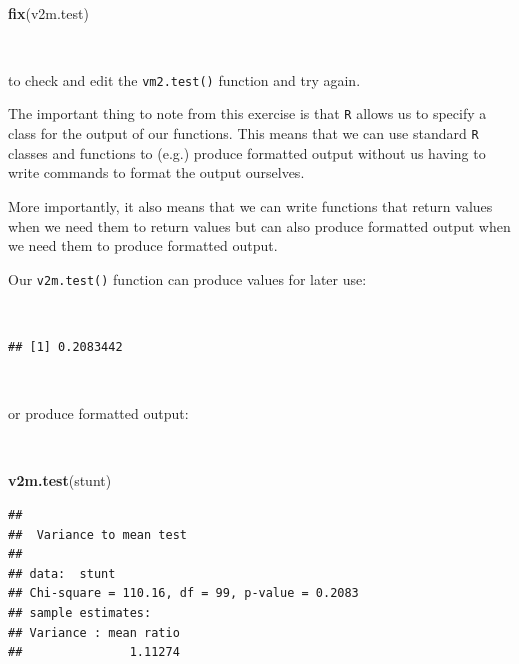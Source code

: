 \documentclass[12pt,a4paper]{book}
\newenvironment{Shaded}{\begin{snugshade}}{\end{snugshade}}
\newcommand{\KeywordTok}[1]{\textcolor[rgb]{0.13,0.29,0.53}{\textbf{#1}}}
\newcommand{\StringTok}[1]{\textcolor[rgb]{0.31,0.60,0.02}{#1}}
\newcommand{\OperatorTok}[1]{\textcolor[rgb]{0.81,0.36,0.00}{\textbf{#1}}}
\newcommand{\NormalTok}[1]{#1}
\theoremstyle{definition}
\theoremstyle{definition}
\theoremstyle{definition}
\theoremstyle{remark}
\begin{document}
~

\begin{Shaded}
\begin{Highlighting}[]
\KeywordTok{fix}\NormalTok{(v2m.test)}
\end{Highlighting}
\end{Shaded}

~

to check and edit the \texttt{vm2.test()} function and try again.

The important thing to note from this exercise is that \texttt{R} allows
us to specify a class for the output of our functions. This means that
we can use standard \texttt{R} classes and functions to (e.g.) produce
formatted output without us having to write commands to format the
output ourselves.

More importantly, it also means that we can write functions that return
values when we need them to return values but can also produce formatted
output when we need them to produce formatted output.

Our \texttt{v2m.test()} function can produce values for later use:

~

\begin{Shaded}
\end{Shaded}

\begin{verbatim}
## [1] 0.2083442
\end{verbatim}

~

or produce formatted output:

~

\begin{Shaded}
\begin{Highlighting}[]
\KeywordTok{v2m.test}\NormalTok{(stunt)}
\end{Highlighting}
\end{Shaded}

\begin{verbatim}
## 
##  Variance to mean test
## 
## data:  stunt
## Chi-square = 110.16, df = 99, p-value = 0.2083
## sample estimates:
## Variance : mean ratio 
##               1.11274
\end{verbatim}

~
\end{document}

